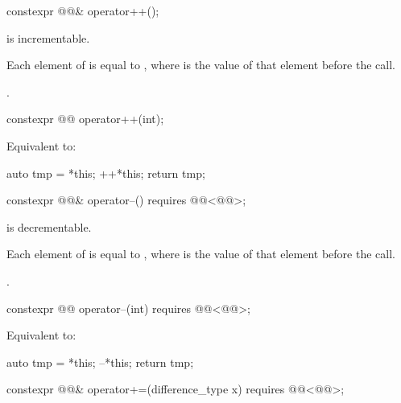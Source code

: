 \begin{itemdecl}
constexpr @@& operator++();
\end{itemdecl}

\begin{itemdescr}
\pnum
\expects
{} is incrementable.

\pnum
\ensures
Each element of  is equal to ,
where  is the value of that element before the call.

\pnum
\returns
{}.
\end{itemdescr}

\begin{itemdecl}
constexpr @@ operator++(int);
\end{itemdecl}

\begin{itemdescr}
\pnum
\effects
Equivalent to:
\begin{codeblock}
auto tmp = *this;
++*this;
return tmp;
\end{codeblock}
\end{itemdescr}

\begin{itemdecl}
constexpr @@& operator--() requires @@<@@>;
\end{itemdecl}

\begin{itemdescr}
\pnum
\expects
{} is decrementable.

\pnum
\ensures
Each element of  is equal to ,
where  is the value of that element before the call.

\pnum
\returns
{}.
\end{itemdescr}

\begin{itemdecl}
constexpr @@ operator--(int) requires @@<@@>;
\end{itemdecl}

\begin{itemdescr}
\pnum
\effects
Equivalent to:
\begin{codeblock}
auto tmp = *this;
--*this;
return tmp;
\end{codeblock}
\end{itemdescr}

\begin{itemdecl}
constexpr @@& operator+=(difference_type x)
  requires @@<@@>;
\end{itemdecl}


